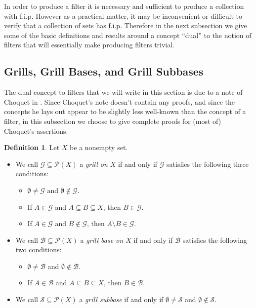 \documentclass[12pt]{article}
\theoremstyle{plain}
\theoremstyle{definition}
\newtheorem{defn}[thm]{Definition}
\newcommand{\calB}{\mathcal{B}}
\newcommand{\calG}{\mathcal{G}}
\newcommand{\calP}{\mathcal{P}}
\newcommand{\calS}{\mathcal{S}}
\begin{document}
In order to produce a filter it is necessary and sufficient to produce a collection with f.i.p.
However as a practical matter, it may be inconvenient or difficult to verify that a collection of sets has f.i.p.
Therefore in the next subsection we give some of the basic definitions and results around a concept ``dual'' to the notion of filters that will essentially make producing filters trivial.

\subsection{Grills, Grill Bases, and Grill Subbases}
The dual concept to filters that we will write in this section is due to a note of Choquet in \cite{Choquet:1947uq}. 
Since Choquet's note doesn't contain any proofs, and since the concepts he lays out appear to be slightly less well-known than the concept of a filter, in this subsection we choose to give complete proofs for (most of) Choquet's assertions.

\begin{defn}
  \label{defn:grill}
  Let $X$ be a nonempty set.
  \begin{itemize}
    \item[(a)] We call $\calG \subseteq \calP(X)$ a \textsl{grill on $X$} if and only if $\calG$ satisfies the following three conditions:
      \begin{itemize}
        \item[(1)] $\emptyset \ne \calG$ and $\emptyset \not\in \calG$.

        \item[(2)] If $A \in \calG$ and $A \subseteq B \subseteq X$, then $B \in \calG$.

        \item[(3)] If $A \in \calG$ and $B \not\in \calG$, then $A \setminus B \in \calG$. 
     \end{itemize}

    \item[(b)] We call $\calB \subseteq \calP(X)$ a \textsl{grill base on $X$} if and only if $\calB$     satisfies the following two conditions:
      \begin{itemize}
        \item[(1)] $\emptyset \ne \calB$ and $\emptyset \not\in \calB$.

        \item[(2)] If $A \in \calB$ and $A \subseteq B \subseteq X$, then $B \in \calB$.
      \end{itemize}

    \item[(c)] We call $\calS \subseteq \calP(X)$ a \textsl{grill subbase} if and only if $\emptyset \ne \calS$ and $\emptyset \not\in \calS$. 
  \end{itemize}
\end{defn}
\end{document}
